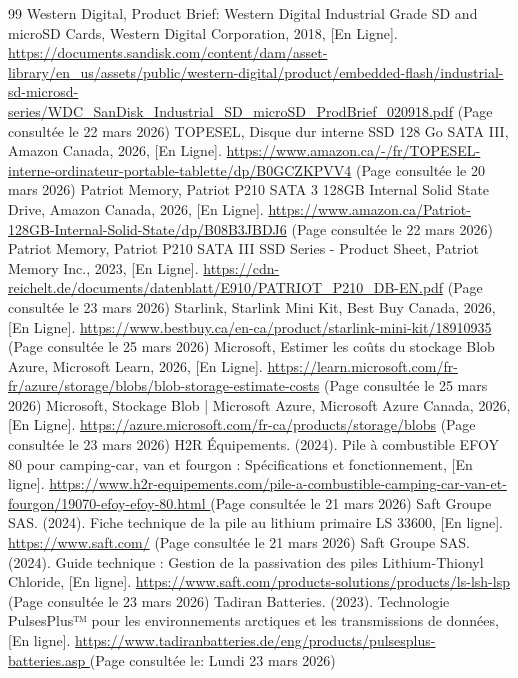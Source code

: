 \begin{thebibliographyUL}{99}
     Western Digital, Product Brief: Western Digital Industrial Grade SD and microSD Cards, Western Digital Corporation, 2018, [En Ligne]. \url{https://documents.sandisk.com/content/dam/asset-library/en_us/assets/public/western-digital/product/embedded-flash/industrial-sd-microsd-series/WDC_SanDisk_Industrial_SD_microSD_ProdBrief_020918.pdf} (Page consultée le 22 mars 2026)
     TOPESEL, Disque dur interne SSD 128 Go SATA III, Amazon Canada, 2026, [En Ligne]. \url{https://www.amazon.ca/-/fr/TOPESEL-interne-ordinateur-portable-tablette/dp/B0GCZKPVV4} (Page consultée le 20 mars 2026)
     Patriot Memory, Patriot P210 SATA 3 128GB Internal Solid State Drive, Amazon Canada, 2026, [En Ligne]. \url{https://www.amazon.ca/Patriot-128GB-Internal-Solid-State/dp/B08B3JBDJ6} (Page consultée le 22 mars 2026)
     Patriot Memory, Patriot P210 SATA III SSD Series - Product Sheet, Patriot Memory Inc., 2023, [En Ligne]. \url {https://cdn-reichelt.de/documents/datenblatt/E910/PATRIOT_P210_DB-EN.pdf} (Page consultée le 23 mars 2026)
     Starlink, Starlink Mini Kit, Best Buy Canada, 2026, [En Ligne]. \url{https://www.bestbuy.ca/en-ca/product/starlink-mini-kit/18910935} (Page consultée le 25 mars 2026)
     Microsoft, Estimer les coûts du stockage Blob Azure, Microsoft Learn, 2026, [En Ligne]. \url{https://learn.microsoft.com/fr-fr/azure/storage/blobs/blob-storage-estimate-costs} (Page consultée le 25 mars 2026)
     Microsoft, Stockage Blob | Microsoft Azure, Microsoft Azure Canada, 2026, [En Ligne]. \url{https://azure.microsoft.com/fr-ca/products/storage/blobs} (Page consultée le 23 mars 2026)
     H2R Équipements. (2024). Pile à combustible EFOY 80 pour camping-car, van et fourgon : Spécifications et fonctionnement, [En ligne]. \url{https://www.h2r-equipements.com/pile-a-combustible-camping-car-van-et-fourgon/19070-efoy-efoy-80.html } (Page consultée le 21 mars 2026)
     Saft Groupe SAS. (2024). Fiche technique de la pile au lithium primaire LS 33600, [En ligne]. \url{https://www.saft.com/} (Page consultée le 21 mars 2026)
     Saft Groupe SAS. (2024). Guide technique : Gestion de la passivation des piles Lithium-Thionyl Chloride, [En ligne]. \url{https://www.saft.com/products-solutions/products/ls-lsh-lsp} (Page consultée le 23 mars 2026)
     Tadiran Batteries. (2023). Technologie PulsesPlus™ pour les environnements arctiques et les transmissions de données, [En ligne]. \url{https://www.tadiranbatteries.de/eng/products/pulsesplus-batteries.asp }(Page consultée le: Lundi 23 mars 2026)

\end{thebibliographyUL}
